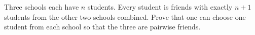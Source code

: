 Three schools each have $n$ students. Every student is friends with exactly $n+1$ students from the other two schools combined. Prove that one can choose one student from each school so that the three are pairwise friends.
